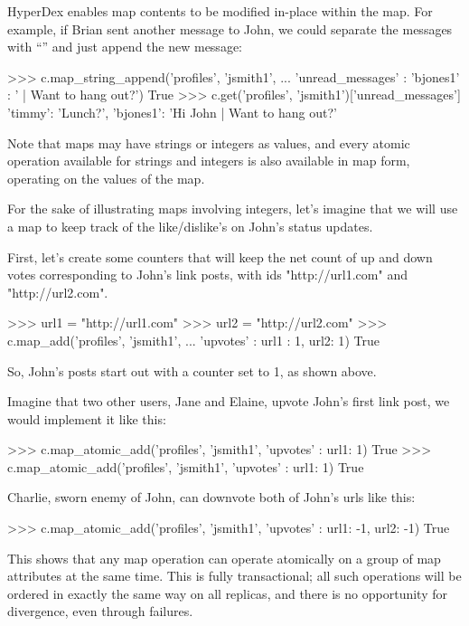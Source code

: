HyperDex enables map contents to be modified in-place within the map.  For
example, if Brian sent another message to John, we could separate the messages
with ``\code{|}'' and just append the new message:

\begin{pythoncode}
>>> c.map_string_append('profiles', 'jsmith1',
...                      {'unread_messages' : {'bjones1' : ' | Want to hang out?'}})
True
>>> c.get('profiles', 'jsmith1')['unread_messages']
{'timmy': 'Lunch?', 'bjones1': 'Hi John | Want to hang out?'}
\end{pythoncode}

Note that maps may have strings or integers as values, and every atomic
operation available for strings and integers is also available in map form,
operating on the values of the map.

For the sake of illustrating maps involving integers, let's imagine that we will
use a map to keep track of the like/dislike's on John's status updates. 

First, let's create some counters that will keep the net count of up and down
votes corresponding to John's link posts, with ids "http://url1.com" and
"http://url2.com". 

\begin{pythoncode}
>>> url1 = "http://url1.com"
>>> url2 = "http://url2.com"
>>> c.map_add('profiles', 'jsmith1',
...           {'upvotes' : {url1 : 1, url2: 1}})
True
\end{pythoncode}

So, John's posts start out with a counter set to 1, as shown above. 

Imagine that two other users, Jane and Elaine, upvote John's first link post, we
would implement it like this:

\begin{pythoncode}
>>> c.map_atomic_add('profiles', 'jsmith1', {'upvotes' : {url1: 1}})
True
>>> c.map_atomic_add('profiles', 'jsmith1', {'upvotes' : {url1: 1}})
True
\end{pythoncode}

Charlie, sworn enemy of John, can downvote both of John's urls like this:

\begin{pythoncode}
>>> c.map_atomic_add('profiles', 'jsmith1', {'upvotes' : {url1: -1, url2: -1}})
True
\end{pythoncode}

This shows that any map operation can operate atomically on a group of map
attributes at the same time. This is fully transactional; all such operations
will be ordered in exactly the same way on all replicas, and there is no
opportunity for divergence, even through failures.

